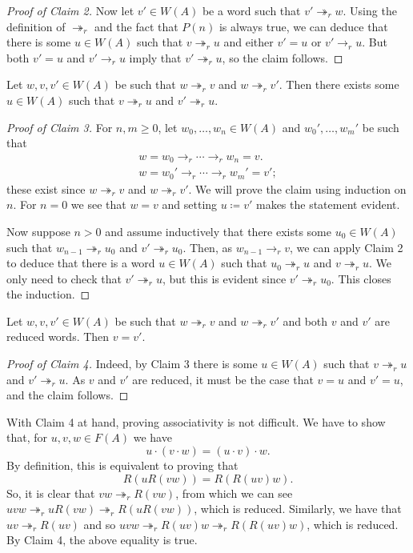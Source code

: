 \begin{solution}
\begin{proof}[Proof of Claim 2]
		Now let $v'\in W(A)$ be a word such that $v'\twoheadrightarrow_r w$. Using the definition of $\twoheadrightarrow_r$ and the fact that $P(n)$ is always true, we can deduce that there is some $u\in W(A)$ such that $v\twoheadrightarrow_r u$ and either $v' = u$ or $v' \to_r u$. But both $v' = u$ and $v' \to_r u$ imply that $v'\twoheadrightarrow_r u$, so the claim follows.
	\end{proof}
	\begin{claim}
		Let $w,v,v'\in W(A)$ be such that $w\twoheadrightarrow_r v$ and $w\twoheadrightarrow_r v'$. Then there exists some $u\in W(A)$ such that $v \twoheadrightarrow_r u$ and $v' \twoheadrightarrow_r u$. 
	\end{claim}
	\begin{proof}[Proof of Claim 3]
		For $n,m\geq 0$, let $w_0,\ldots,w_n\in W(A)$ and $w_0',\ldots,w_m'$ be such that
		\begin{gather*}
				w = w_0 \to_r \cdots \to_r w_{n} = v.\\
				w = w_0' \to_r \cdots \to_r w_m' = v';
		\end{gather*}
		these exist since $w\twoheadrightarrow_r v$ and $w\twoheadrightarrow_r v'$. We will prove the claim using induction on $n$. For $n = 0$ we see that $w =v$ and setting $u\coloneqq v'$ makes the statement evident. 
		
		Now suppose $n> 0$ and assume inductively that there exists some $u_0\in W(A)$ such that $w_{n-1}\twoheadrightarrow_r u_0$ and $v'\twoheadrightarrow_r u_0$. Then, as $w_{n-1}\to_r v$, we can apply Claim 2 to deduce that there is a word $u\in W(A)$ such that $u_0 \twoheadrightarrow_r u$ and $v\twoheadrightarrow_r u$. We only need to check that $v'\twoheadrightarrow_r u$, but this is evident since $v'\twoheadrightarrow_r u_0$. This closes the induction.
	\end{proof}
	\begin{claim}
		Let $w,v,v'\in W(A)$ be such that $w\twoheadrightarrow_r v$ and $w\twoheadrightarrow_r v'$ and both $v$ and $v'$ are reduced words. Then $v = v'$.
	\end{claim}
	\begin{proof}[Proof of Claim 4]
		Indeed, by Claim 3 there is some $u\in W(A)$ such that $v\twoheadrightarrow_r u$ and $v'\twoheadrightarrow_r u$. As $v$ and $v'$ are reduced, it must be the case that $v = u$ and $v' = u$, and the claim follows.
	\end{proof}
	With Claim 4 at hand, proving associativity is not difficult. We have to show that, for $u,v,w\in F(A)$ we have
	\[
		u\cdot (v\cdot w) = (u\cdot v) \cdot w.
	\]
	By definition, this is equivalent to proving that
	\[
		R(uR(vw)) = R(R(uv)w).
	\]
	So, it is clear that $vw \twoheadrightarrow_r R(vw)$, from which we can see $uvw \twoheadrightarrow_r uR(vw) \twoheadrightarrow_r R(uR(vw))$, which is reduced. Similarly, we have that $uv \twoheadrightarrow_r R(uv)$ and so $uvw \twoheadrightarrow_r R(uv)w \twoheadrightarrow_r R(R(uv)w)$, which is reduced. By Claim 4, the above equality is true.
\end{solution}

